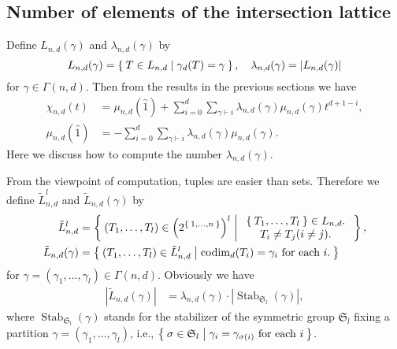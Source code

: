 \documentclass{wstmp}
\begin{document}
\subsection{Number of elements of the intersection lattice}
\label{subsec:number-of-elements}

Define $L_{n,d}(\gamma)$ and $\lambda_{n,d}(\gamma)$
by
\[
L_{n,d}(\gamma)=\Set{T \in L_{n,d}| \gamma_d(T)=\gamma},\quad 
\lambda_{n,d}(\gamma) = {\left|{L_{n,d}(\gamma)}\right|}
\]
for $\gamma\in \Gamma(n,d)$.
Then from the results in the previous sections we have
\begin{align*}
\chi_{n,d}(t) 
&=
 \mu_{n,d}({\hat{1}})+
\sum_{i=0}^{d}
\sum_{\gamma {\vdash} i} 
\lambda_{n,d}(\gamma)\mu_{n,d}(\gamma) t^{d+1-i}
, 
\\
  \mu_{n,d}({\hat{1}})
&=- 
\sum_{i=0}^{d}
\sum_{\gamma {\vdash} i} 
 \lambda_{n,d}(\gamma)\mu_{n,d}(\gamma).
\end{align*}
Here we discuss how to compute the number $\lambda_{n,d}(\gamma)$.

From the viewpoint of computation,
tuples are easier than sets. 
Therefore we define $\tilde L^l_{n,d}$ and $\tilde L_{n,d}(\gamma)$ by
\begin{align*}
\tilde L^l_{n,d}&=
\Set{(T_1,\ldots,T_l)\in
 \left(2^{\Set{1,\ldots,n}}\right)^l
|
\begin{array}{c}
\Set{T_1,\ldots,T_l} \in L_{n,d}.\\
T_i\neq T_j (i\neq j).
\end{array}
},\\
\tilde L_{n,d}(\gamma)&=
\Set{
(T_1,\ldots,T_l)\in \tilde L^l_{n,d}
|
\text{${\operatorname{codim}}_d(T_i) = \gamma_i$ for each $i$.}
}
\end{align*}
for $\gamma=(\gamma_1,\ldots,\gamma_l)\in \Gamma(n,d)$.
Obviously we have
 \begin{align*}
 {\left|{\tilde L_{n,d}(\gamma)}\right|}
& =\lambda_{n,d}(\gamma)\cdot{\left|{{\operatorname{Stab}}_{\mathfrak{S}_l}(\gamma)}\right|},
 \end{align*}
where
${\operatorname{Stab}}_{\mathfrak{S}_l}(\gamma)$ stands for
the stabilizer of the symmetric group $\mathfrak{S}_l$ fixing 
a partition 
$\gamma=(\gamma_1, \dots, \gamma_l)$,
i.e.,
$\Set{\sigma\in \mathfrak{S}_l|\text{$\gamma_i=\gamma_{\sigma(i)}$ for each $i$}}$.
\end{document}
